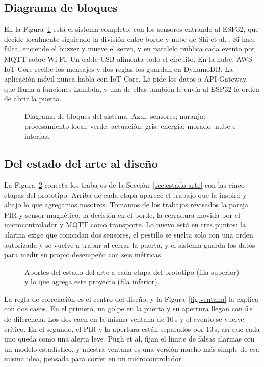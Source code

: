 \documentclass[manuscript,screen,nonacm]{acmart}
\begin{document}
\subsection{Diagrama de bloques}
En la Figura~\ref{fig:bloques} está el sistema completo, con los sensores entrando al ESP32, que decide localmente siguiendo la división entre borde y nube de Shi et al. \cite{shi2016edge}. Si hace falta, enciende el buzzer y mueve el servo, y en paralelo publica cada evento por MQTT sobre Wi-Fi. Un cable USB alimenta todo el circuito. En la nube, AWS IoT Core recibe los mensajes y dos reglas los guardan en DynamoDB. La aplicación móvil nunca habla con IoT Core. Le pide los datos a API Gateway, que llama a funciones Lambda, y una de ellas también le envía al ESP32 la orden de abrir la puerta.

\begin{figure}[htbp]
\centering
{}
\caption{Diagrama de bloques del sistema. Azul: sensores; naranja: procesamiento local; verde: actuación; gris: energía; morado: nube e interfaz.}
\label{fig:bloques}
\end{figure}

\subsection{Del estado del arte al diseño}
La Figura~\ref{fig:aportes} conecta los trabajos de la Sección~\ref{sec:estado-arte} con las cinco etapas del prototipo. Arriba de cada etapa aparece el trabajo que la inspiró y abajo lo que agregamos nosotros. Tomamos de los trabajos revisados la pareja PIR y sensor magnético, la decisión en el borde, la cerradura movida por el microcontrolador y MQTT como transporte. Lo nuevo está en tres puntos: la alarma exige que coincidan dos sensores, el pestillo se suelta solo con una orden autorizada y se vuelve a trabar al cerrar la puerta, y el sistema guarda los datos para medir su propio desempeño con seis métricas.

\begin{figure}[htbp]
\centering
{}
\caption{Aportes del estado del arte a cada etapa del prototipo (fila superior) y lo que agrega este proyecto (fila inferior).}
\label{fig:aportes}
\end{figure}

La regla de correlación es el centro del diseño, y la Figura~\ref{fig:ventana} la explica con dos casos. En el primero, un golpe en la puerta y su apertura llegan con 5\,s de diferencia. Los dos caen en la misma ventana de 10\,s y el evento se vuelve crítico. En el segundo, el PIR y la apertura están separados por 13\,s, así que cada uno queda como una alerta leve. Pugh et al. \cite{pugh2015fusion} fijan el límite de falsas alarmas con un modelo estadístico, y nuestra ventana es una versión mucho más simple de esa misma idea, pensada para correr en un microcontrolador.
\end{document}
